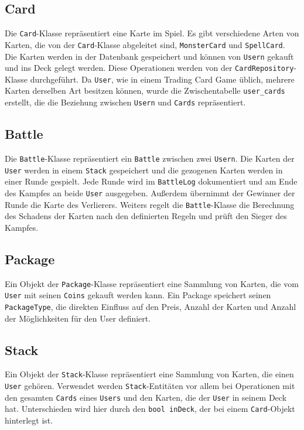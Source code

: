 \documentclass[a4paper, 12pt]{article}
\begin{document}
\subsection{Card}
Die \texttt{Card}-Klasse repräsentiert eine Karte im Spiel. Es gibt verschiedene Arten von Karten, die von der \texttt{Card}-Klasse abgeleitet sind, \texttt{MonsterCard} und \texttt{SpellCard}.
Die Karten werden in der Datenbank gespeichert und können von \texttt{Usern} gekauft und ins Deck gelegt werden. Diese Operationen werden von der \texttt{CardRepository}-Klasse durchgeführt.
Da \texttt{User}, wie in einem Trading Card Game üblich, mehrere Karten derselben Art besitzen können, wurde die Zwischentabelle \texttt{user\_cards} erstellt, die die Beziehung zwischen \texttt{Usern} und \texttt{Cards} repräsentiert.

\subsection{Battle}
Die \texttt{Battle}-Klasse repräsentiert ein \texttt{Battle} zwischen zwei \texttt{Usern}. Die Karten der \texttt{User} werden in einem \texttt{Stack} gespeichert und die gezogenen Karten werden in einer Runde gespielt.
Jede Runde wird im \texttt{BattleLog} dokumentiert und am Ende des Kampfes an beide \texttt{User} ausgegeben. Außerdem übernimmt der Gewinner der Runde die Karte des Verlierers.
Weiters regelt die \texttt{Battle}-Klasse die Berechnung des Schadens der Karten nach den definierten Regeln und prüft den Sieger des Kampfes.

\subsection{Package}
Ein Objekt der \texttt{Package}-Klasse repräsentiert eine Sammlung von Karten, die vom \texttt{User} mit seinen \texttt{Coins} gekauft werden kann.
Ein Package speichert seinen \texttt{PackageType}, die direkten Einfluss auf den Preis, Anzahl der Karten und Anzahl der Möglichkeiten für den User definiert.

\subsection{Stack}
Ein Objekt der \texttt{Stack}-Klasse repräsentiert eine Sammlung von Karten, die einen \texttt{User} gehören. Verwendet werden \texttt{Stack}-Entitäten vor allem bei Operationen
mit den gesamten \texttt{Cards} eines \texttt{Users} und den Karten, die der \texttt{User} in seinem Deck hat. Unterschieden wird hier durch den \texttt{bool inDeck}, der bei einem \texttt{Card}-Objekt hinterlegt ist.
\end{document}
